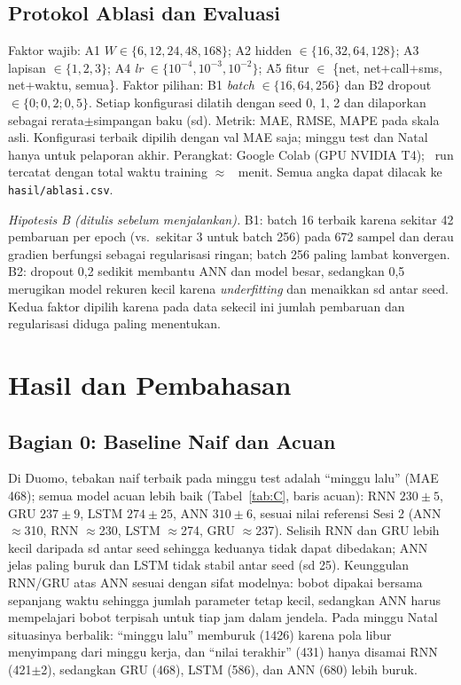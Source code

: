 \documentclass[conference,a4paper]{IEEEtran}
\newcommand{\isi}[1]{\textcolor{red}{[#1]}}
\newcommand{\tabel}[1]{\InputIfFileExists{hasil/tabel/#1.tex}{}{\isi{tabel #1 belum dibuat: jalankan buat\_tabel.py}}}
\begin{document}
\subsection{Protokol Ablasi dan Evaluasi}
Faktor wajib: A1 $W\in\{6,12,24,48,168\}$; A2 hidden $\in\{16,32,64,128\}$; A3 lapisan $\in\{1,2,3\}$; A4 \textit{lr} $\in\{10^{-4},10^{-3},10^{-2}\}$; A5 fitur $\in$ \{net, net+call+sms, net+waktu, semua\}. Faktor pilihan: B1 \textit{batch} $\in\{16,64,256\}$ dan B2 dropout $\in\{0;0{,}2;0{,}5\}$. Setiap konfigurasi dilatih dengan seed 0, 1, 2 dan dilaporkan sebagai rerata$\pm$simpangan baku (sd). Metrik: MAE, RMSE, MAPE pada skala asli. Konfigurasi terbaik dipilih dengan val MAE saja; minggu test dan Natal hanya untuk pelaporan akhir. Perangkat: Google Colab (GPU NVIDIA T4); \jumlahrun\ run tercatat dengan total waktu training $\approx$ \totalmenit\ menit. Semua angka dapat dilacak ke \texttt{hasil/ablasi.csv}.

\emph{Hipotesis B (ditulis sebelum menjalankan).} B1: batch 16 terbaik karena sekitar 42 pembaruan per epoch (vs.\ sekitar 3 untuk batch 256) pada 672 sampel dan derau gradien berfungsi sebagai regularisasi ringan; batch 256 paling lambat konvergen. B2: dropout 0,2 sedikit membantu ANN dan model besar, sedangkan 0,5 merugikan model rekuren kecil karena \textit{underfitting} dan menaikkan sd antar seed. Kedua faktor dipilih karena pada data sekecil ini jumlah pembaruan dan regularisasi diduga paling menentukan.

\section{Hasil dan Pembahasan}
\subsection{Bagian 0: Baseline Naif dan Acuan}
\tabel{tab_naif}
Di Duomo, tebakan naif terbaik pada minggu test adalah ``minggu lalu'' (MAE 468); semua model acuan lebih baik (Tabel~\ref{tab:C}, baris acuan): RNN $230\pm5$, GRU $237\pm9$, LSTM $274\pm25$, ANN $310\pm6$, sesuai nilai referensi Sesi 2 (ANN $\approx$310, RNN $\approx$230, LSTM $\approx$274, GRU $\approx$237). Selisih RNN dan GRU lebih kecil daripada sd antar seed sehingga keduanya tidak dapat dibedakan; ANN jelas paling buruk dan LSTM tidak stabil antar seed (sd 25). Keunggulan RNN/GRU atas ANN sesuai dengan sifat modelnya: bobot dipakai bersama sepanjang waktu sehingga jumlah parameter tetap kecil, sedangkan ANN harus mempelajari bobot terpisah untuk tiap jam dalam jendela. Pada minggu Natal situasinya berbalik: ``minggu lalu'' memburuk (1426) karena pola libur menyimpang dari minggu kerja, dan ``nilai terakhir'' (431) hanya disamai RNN (421$\pm$2), sedangkan GRU (468), LSTM (586), dan ANN (680) lebih buruk.
\end{document}
